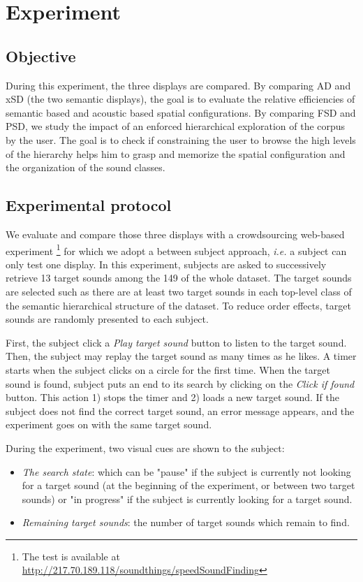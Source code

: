 \documentclass{aes2e}
\begin{document}
\section{Experiment} \label{test}

\subsection{Objective}

During this experiment, the three displays are compared. By comparing AD and xSD (the two semantic displays), the goal is to evaluate the  relative efficiencies of semantic based and acoustic based spatial configurations. By comparing FSD and PSD, we study the impact of an enforced hierarchical exploration of the corpus by the user. The goal is to check if constraining the user to browse the high levels of the hierarchy helps him to grasp and memorize the spatial configuration and the organization of the sound classes. 

\subsection{Experimental protocol}

We evaluate and compare those three displays with a crowdsourcing web-based experiment \footnote{The test is available at \url{http://217.70.189.118/soundthings/speedSoundFinding}} for which we adopt a between subject approach, \textit{i.e.} a subject can only test one display. In this experiment, subjects are asked to successively retrieve 13 target sounds among the 149 of the whole dataset. The target sounds are selected such as there are at least two target sounds in each top-level class of the semantic hierarchical structure of the dataset. To reduce order effects, target sounds are randomly presented to each subject.

First, the subject click a \textit{Play target sound} button to listen to the target sound. Then, the subject may replay the target sound  as many times as he likes. A timer starts when the subject clicks on a circle for the first time. When the target sound is found, subject puts an end to its search by clicking on the \textit{Click if found} button. This action 1) stops the timer and 2) loads a new target sound. If the subject does not find the correct target sound, an error message appears, and the experiment goes on with the same target sound.

During the experiment, two visual cues are shown to the subject:
\begin{itemize}
\item \textit{The search state}: which can be "pause" if the subject is currently not looking for a target sound (at the beginning of the experiment, or between two target sounds) or  "in progress"  if the subject is currently looking for a target sound.
\item \textit{Remaining target sounds}: the number of target sounds which remain to find.
\end{itemize}
\end{document}

